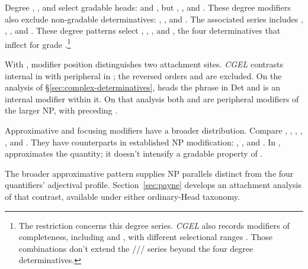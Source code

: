 \documentclass[12pt]{article}
\begin{document}
Degree , , and  select gradable heads:  and , but , , and . These degree modifiers also exclude non-gradable determinatives: , , and . The associated series includes , , , and . These degree patterns select , , , and , the four determinatives that inflect for grade \citep[393--395, 431--432]{huddleston2002}.\footnote{The restriction concerns this degree series. \textit{CGEL} also records modifiers of completeness, including  and , with different selectional ranges \citep[432]{huddleston2002}. Those combinations don't extend the /// series beyond the four degree determinatives.}

With , modifier position distinguishes two attachment sites. \textit{CGEL} contrasts internal  in  with peripheral  in  \citep[p.~392, (61)]{huddleston2002}; the reversed orders  and  are excluded. On the analysis of §\ref{sec:complex-determinatives},  heads the phrase in Det and  is an internal modifier within it. On that analysis both  and  are peripheral modifiers of the larger NP, with  preceding .

Approximative and focusing modifiers have a broader distribution. Compare , , , , , and . They have counterparts in established NP modification: , , and . In ,  approximates the quantity; it doesn't intensify a gradable property of .

The broader approximative pattern supplies NP parallels distinct from the four quantifiers' adjectival profile. Section~\ref{sec:payne} develops an attachment analysis of that contrast, available under either ordinary-Head taxonomy.
\end{document}
